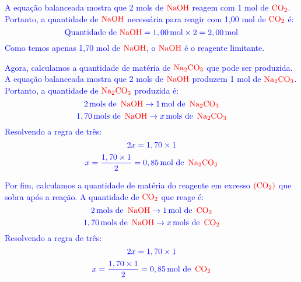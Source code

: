 \documentclass[a4paper, 12pt]{article}
\begin{document}
\begin{enumerate}
          \textcolor{blue}{A equação balanceada mostra que 2 mols de \(\textcolor{red}{\text{NaOH}}\) reagem com 1 mol de \(\textcolor{red}{\text{CO}_2}\). Portanto, a quantidade de \(\textcolor{red}{\text{NaOH}}\) necessária para reagir com 1,00 mol de \(\textcolor{red}{\text{CO}_2}\) é:}
          \[
              \textcolor{blue}{\text{Quantidade de } \textcolor{red}{\text{NaOH}} = 1,00 \, \text{mol} \times 2 = 2,00 \, \text{mol}}
          \]
          \textcolor{blue}{Como temos apenas 1,70 mol de \(\textcolor{red}{\text{NaOH}}\), o \(\textcolor{red}{\text{NaOH}}\) é o reagente limitante.}

          \textcolor{blue}{Agora, calculamos a quantidade de matéria de \(\textcolor{red}{\text{Na}_2\text{CO}_3}\) que pode ser produzida. A equação balanceada mostra que 2 mols de \(\textcolor{red}{\text{NaOH}}\) produzem 1 mol de \(\textcolor{red}{\text{Na}_2\text{CO}_3}\). Portanto, a quantidade de \(\textcolor{red}{\text{Na}_2\text{CO}_3}\) produzida é:}
          \[
              \textcolor{blue}{2 \, \text{mols de } \, \textcolor{red}{\text{NaOH}} \rightarrow 1 \, \text{mol de } \, \textcolor{red}{\text{Na}_2\text{CO}_3}}
          \]
          \[
              \textcolor{blue}{1,70 \, \text{mols de } \, \textcolor{red}{\text{NaOH}} \rightarrow x \, \text{mols de } \, \textcolor{red}{\text{Na}_2\text{CO}_3}}
          \]
          \textcolor{blue}{Resolvendo a regra de três:}
          \[
              \textcolor{blue}{2x = 1,70  \times 1}
          \]
          \[
              \textcolor{blue}{x = \frac{1,70 \times 1 }{2} = 0,85 \, \text{mol de } \, \textcolor{red}{\text{Na}_2\text{CO}_3}}
          \]

          \textcolor{blue}{Por fim, calculamos a quantidade de matéria do reagente em excesso \(\textcolor{red}{(\text{CO}_2)}\) que sobra após a reação. A quantidade de \(\textcolor{red}{\text{CO}_2}\) que reage é:}
          \[
              \textcolor{blue}{2 \, \text{mols de } \, \textcolor{red}{\text{NaOH}} \rightarrow 1 \, \text{mol de } \,\textcolor{red}{ \text{CO}_2}}
          \]
          \[
              \textcolor{blue}{ 1,70 \, \text{mols de } \, \textcolor{red}{\text{NaOH}} \rightarrow x \, \text{mols de } \, \textcolor{red}{\text{CO}_2}}
          \]
          \textcolor{blue}{Resolvendo a regra de três:}
          \[
              \textcolor{blue}{2x = 1,70  \times 1}
          \]
          \[
              \textcolor{blue}{x = \frac{1,70  \times 1}{2} = 0,85 \, \text{mol de } \, \textcolor{red}{\text{CO}_2}}
          \]


\end{enumerate}
\end{document}
